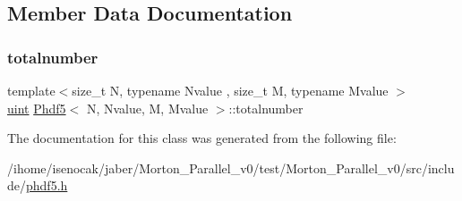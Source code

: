 \subsection{Member Data Documentation}
\mbox{\label{classPhdf5_a4bb1cd4f86aac47741578a1d904ce2b0}} 
\subsubsection{\texorpdfstring{totalnumber}{totalnumber}}
{\footnotesize\ttfamily template$<$size\+\_\+t N, typename Nvalue , size\+\_\+t M, typename Mvalue $>$ \\
\mbox{\hyperlink{definitions_8h_a69aa29b598b851b0640aa225a9e5d61d}{uint}} \mbox{\hyperlink{classPhdf5}{Phdf5}}$<$ N, Nvalue, M, Mvalue $>$\+::totalnumber\hspace{0.3cm}{\ttfamily [private]}}



The documentation for this class was generated from the following file\+:\begin{DoxyCompactItemize}
\item 
/ihome/isenocak/jaber/\+Morton\+\_\+\+Parallel\+\_\+v0/test/\+Morton\+\_\+\+Parallel\+\_\+v0/src/include/\mbox{\hyperlink{phdf5_8h}{phdf5.\+h}}\end{DoxyCompactItemize}
